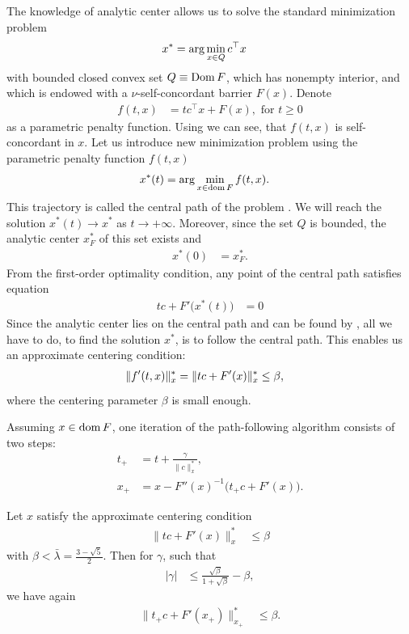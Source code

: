 The knowledge of analytic center allows us to solve the standard minimization problem
\begin{align}
  x^* &= \arg\min_{x\in Q} c^\top x \labeleq{SDP:scb:standardProblem}
\end{align}
with bounded closed convex set $Q \equiv \operatorname{Dom} F$, which has nonempty interior, and which is endowed with a $\nu$-self-concordant barrier $F(x)$.
Denote
\begin{align}
  f(t,x) &= tc^\top x + F(x), \text{ for } t \geq 0
\end{align}
as a parametric penalty function.
Using  we can see, that $f(t,x)$ is self-concordant in $x$.
Let us introduce new minimization problem using the parametric penalty function $f(t,x)$
\begin{align}
  x^*(t) &= \arg\min_{x\in\dom F} f(t,x).\labeleq{SDP:scb:centralPath}
\end{align}
This trajectory is called the central path of the problem .
We will reach the solution $x^*(t) \rightarrow x^*$ as $t \rightarrow +\infty$.
Moreover, since the set $Q$ is bounded, the analytic center $x^*_F$ of this set exists and
\begin{align}
  x^*(0) &= x^*_F.
\end{align}
From the first-order optimality condition, any point of the central path satisfies equation
\begin{align}
  tc + F'\big(x^*(t)\big) &= 0
\end{align}
Since the analytic center lies on the central path and can be found by , all we have to do, to find the solution $x^*$, is to follow the central path. 
This enables us an approximate centering condition:
\begin{align}
  \|f'(t,x)\|^*_x = \|tc + F'(x)\|^*_x &\leq \beta, \labeleq{SDP:scb:cntrCondition}
\end{align}
where the centering parameter $\beta$ is small enough.

Assuming $x\in\operatorname{dom} F$, one iteration of the path-following algorithm consists of two steps:
\begin{align}
  t_+ &= t + \frac{\gamma}{\|c\|^*_x},\\
  x_+ &= x - F''(x)^{-1}\big(t_+c+F'(x)\big).
\end{align}

\begin{theorem}
  Let $x$ satisfy the approximate centering condition 
  \begin{align}
    \|tc + F'(x)\|^*_x &\leq \beta
  \end{align}
  with $\beta < \bar{\lambda} = \frac{3-\sqrt{5}}{2}$.
  Then for $\gamma$, such that
  \begin{align}
    |\gamma| &\leq \frac{\sqrt{\beta}}{1+\sqrt{\beta}} - \beta,
  \end{align}
  we have again
  \begin{align}
    \|t_+c + F'(x_+)\|^*_{x_+} &\leq \beta.
  \end{align}
\end{theorem}

